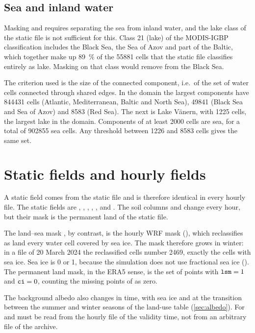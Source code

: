 \subsection{Sea and inland water}
\label{sec:mare}

Masking  and  requires separating the sea from inland water, and the lake
class of the static file is not sufficient for this. Class 21 (lake) of the MODIS-IGBP
classification includes the Black Sea, the Sea of Azov and part of the Baltic, which together make
up \SI{89}{\percent} of the \num{55881} cells that the static file classifies entirely as lake.
Masking on that class would remove  from the Black Sea.

The criterion used is the size of the connected component, i.e.\ of the set of water cells
connected through shared edges. In the domain the largest components have \num{844431} cells (Atlantic,
Mediterranean, Baltic and North Sea), \num{49841} (Black Sea and Sea of Azov) and \num{8583} (Red
Sea). The next is Lake Vänern, with \num{1225} cells, the largest lake in the domain. Components of
at least \num{2000} cells are sea, for a total of \num{902855} sea cells. Any threshold between
\num{1226} and \num{8583} cells gives the same set.

\section{Static fields and hourly fields}
\label{sec:statici-orari}

A static field comes from the static file and is therefore identical in every hourly file. The
static fields are , , , , ,  and
. The soil columns  and  change every hour, but their mask
is the permanent land of the static file.

The land--sea mask , by contrast, is the hourly WRF mask (), which
reclassifies as land every water cell covered by sea ice. The mask therefore grows in winter: in a
file of 20 March 2024 the reclassified cells number \num{2469}, exactly the cells with sea ice.
Sea ice  is 0 or 1, because the simulation does not use fractional sea ice
(). The permanent land mask, in the ERA5 sense, is the set of points
with $\campo{lsm} = 1$ and $\campo{ci} = 0$, counting the missing points of  as zero.

The background albedo  also changes in time, with sea ice and at the transition between
the summer and winter seasons of the land-use table (\cref{sec:albedo}). For  and
 must be read from the hourly file of the validity time, not from an arbitrary file of
the archive.

